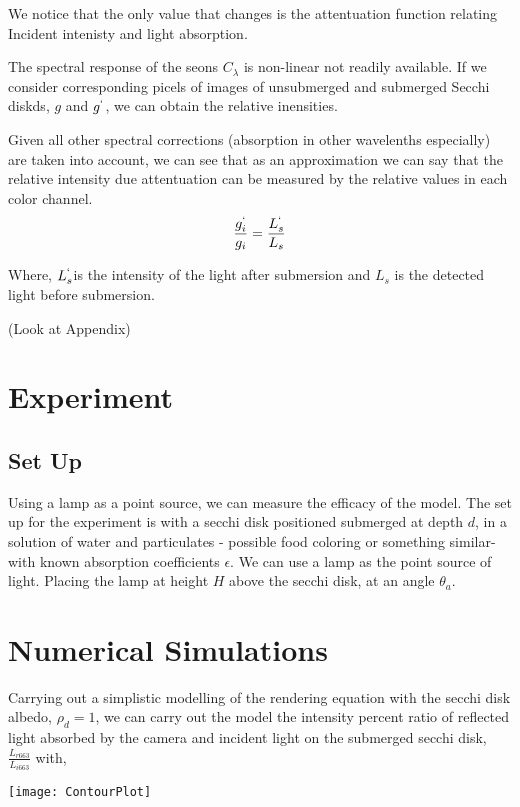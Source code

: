 \documentclass{article}
\begin{document}
We notice that the only value that changes is the attentuation function relating Incident intenisty
and light absorption.

The spectral response of the seons $ C_\lambda$ is non-linear not readily available.
If we consider corresponding picels of images of unsubmerged and submerged Secchi
diskds, $ g$ and $g^`$, we can obtain the relative inensities.

Given all other spectral corrections (absorption in other wavelenths especially) are taken into account,
we can see that as an approximation we can say that the relative intensity due attentuation can be
measured by the relative values in each color channel.
\begin{align}
\frac{g_i^`}{g_i} = \frac{L^`_{s}}{L_{s}}
\end{align}

Where, $ L^`_{s}$is the intensity of the light after submersion and $ L_{s}$ is the detected light before submersion.

(Look at Appendix)

\textbf{}
\section{Experiment}

\subsection{Set Up}
Using a lamp as a point source, we can measure the efficacy of the model. The set up for the experiment is
with a secchi disk positioned submerged at depth $d$, in a solution of water and particulates - possible food coloring
or something similar- with known absorption coefficients $ \epsilon$. We can use a lamp as the point source of light. Placing
the lamp at height $ H$ above the secchi disk, at an angle $\theta_a$.

\section{Numerical Simulations}

Carrying out a simplistic modelling of the rendering equation with the secchi disk albedo, $ \rho_d = 1$,
we can carry out the model the intensity percent ratio of reflected light absorbed by the camera and incident light on
the submerged secchi disk, $ \frac{L_{r663}}{L_{i 663}}$ with,
\begin{center}
    \texttt{[image: ContourPlot]}
\end{center}
\end{document}
